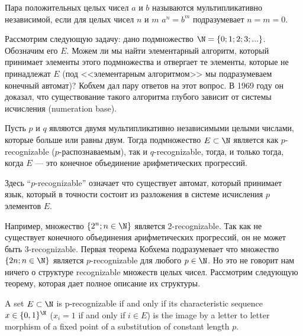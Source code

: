 
    \begin{Def}
        Пара положительных целых чисел $a$ и $b$ называются мультипликативно независимой, если для целых чисел $n$ и $m$ $a^n = b^m$ подразумевает $n = m = 0$.
    \end{Def}
    
    \begin{Rem}
        Рассмотрим следующую задачу: дано подмножество $\N = \{0;1;2;3;...\}$. Обозначим его $E$. Можем ли мы найти элементарный алгоритм, который принимает элементы этого подмножества и отвергает те элементы, которые не принадлежат $E$ (под <<элементарным алгоритмом>> мы подразумеваем конечный автомат)? Кобхем дал пару ответов на этот вопрос. В 1969 году он доказал, что существование такого алгоритма глубого зависит от системы исчисления (numeration base). 
    \end{Rem}
    
    \begin{Thm}
        Пусть $p$ и $q$ являются двумя мультипликативно независимыми целыми числами, которые больше или равны двум. Тогда подмножество $E \subset \N$ является как $p$-recognizable ($p$-распознаваемым), так и $q$-recognizable, тогда, и только тогда, когда $E$ --- это конечное объединение арифметических прогрессий.
    \end{Thm}
    
    \begin{Rem}
        Здесь ``$p$-recognizable'' означает что существует автомат, который принимает язык, который в точности состоит из разложения в системе исчисления $p$ элементов $E$.
    \end{Rem}
    
    \begin{Example}
        Например, множество $\{2^n; n \in \N\}$ является 2-recognizable. Так как не существует конечного объединения арифметических прогрессий, он не может быть 3-recognizable. Первая теорема Кобхема подразумевает что множество $\{2n;n \in \N\}$ является $p$-recognizable для любого $p \in \N$. Но это не говорит нам ничего о структуре recognizable множеств целых чисел. Рассмотрим следующую теорему, которая дает полное описание их структуры. 
    \end{Example}
    
    \begin{Thm}
        A set $E \subset \N$ is p-recognizable if and only if its characteristic sequence $x \in \{0,1\}^\N$ ($x_i = 1$ if and only if $i \in E$) is the image by a letter to letter morphism of a ﬁxed point of a substitution of constant length $p$.
    \end{Thm}
    
